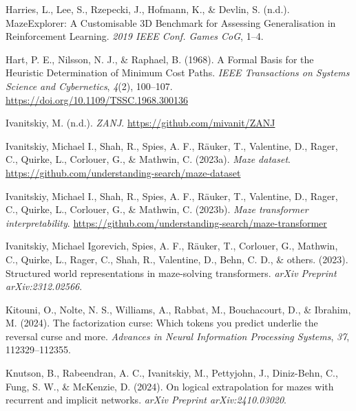 \documentclass[10pt,a4paper,onecolumn]{article}
\newlength{\cslhangindent}
\newenvironment{CSLReferences}[2] %
 {\begin{list}{}{%
  \setlength{\itemindent}{0pt}
  \setlength{\leftmargin}{0pt}
  \setlength{\parsep}{0pt}
  \ifodd #1
   \setlength{\leftmargin}{\cslhangindent}
   \setlength{\itemindent}{-1\cslhangindent}
  \fi
  \setlength{\itemsep}{#2\baselineskip}}}
 {\end{list}}
\begin{document}
\begin{CSLReferences}{1}{0.5}
\leavevmode{}%
Harries, L., Lee, S., Rzepecki, J., Hofmann, K., \& Devlin, S. (n.d.).
{MazeExplorer}: {A Customisable 3D Benchmark} for {Assessing
Generalisation} in {Reinforcement Learning}. \emph{2019 {IEEE Conf}.
{Games CoG}}, 1--4.

\leavevmode{}%
Hart, P. E., Nilsson, N. J., \& Raphael, B. (1968). A {Formal Basis} for
the {Heuristic Determination} of {Minimum Cost Paths}. \emph{IEEE
Transactions on Systems Science and Cybernetics}, \emph{4}(2), 100--107.
\url{https://doi.org/10.1109/TSSC.1968.300136}

\leavevmode{}%
Ivanitskiy, M. (n.d.). \emph{ZANJ}.
\url{https://github.com/mivanit/ZANJ}

\leavevmode{}%
Ivanitskiy, Michael I., Shah, R., Spies, A. F., Räuker, T., Valentine,
D., Rager, C., Quirke, L., Corlouer, G., \& Mathwin, C. (2023a).
\emph{Maze dataset}.
\url{https://github.com/understanding-search/maze-dataset}

\leavevmode{}%
Ivanitskiy, Michael I., Shah, R., Spies, A. F., Räuker, T., Valentine,
D., Rager, C., Quirke, L., Corlouer, G., \& Mathwin, C. (2023b).
\emph{Maze transformer interpretability}.
\url{https://github.com/understanding-search/maze-transformer}

\leavevmode{}%
Ivanitskiy, Michael Igorevich, Spies, A. F., Räuker, T., Corlouer, G.,
Mathwin, C., Quirke, L., Rager, C., Shah, R., Valentine, D., Behn, C.
D., \& others. (2023). Structured world representations in maze-solving
transformers. \emph{arXiv Preprint arXiv:2312.02566}.

\leavevmode{}%
Kitouni, O., Nolte, N. S., Williams, A., Rabbat, M., Bouchacourt, D., \&
Ibrahim, M. (2024). The factorization curse: Which tokens you predict
underlie the reversal curse and more. \emph{Advances in Neural
Information Processing Systems}, \emph{37}, 112329--112355.

\leavevmode{}%
Knutson, B., Rabeendran, A. C., Ivanitskiy, M., Pettyjohn, J.,
Diniz-Behn, C., Fung, S. W., \& McKenzie, D. (2024). On logical
extrapolation for mazes with recurrent and implicit networks.
\emph{arXiv Preprint arXiv:2410.03020}.


\end{CSLReferences}
\end{document}

